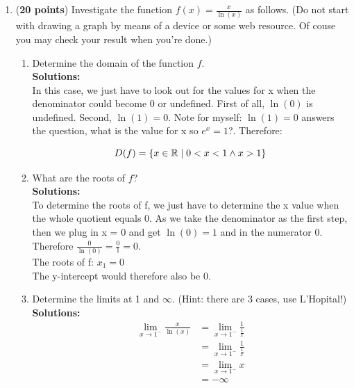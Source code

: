 \documentclass[a4paper]{article}
\begin{document}
\begin{enumerate}


\item (\textbf{20 points}) Investigate the function $f(x) = \frac{x}{\ln(x)}$ as follows. (Do not start with drawing a graph by means of a device or some web resource. Of couse you may check your result when you're done.)

\begin{enumerate}
	\item Determine the domain of the function $f$.\\
	\textbf{Solutions:}\\
	
In this case, we just have to look out for the values for x when the denominator could become 0 or undefined. First of all, $\ln(0)$ is undefined. Second, $\ln(1) = 0$. Note for myself: $\ln(1) = 0$ answers the question, what is the value for x so $e^x = 1$?. Therefore:	
	
	\begin{equation}
		D(f) = \{ x \in \mathbb{R} \; | \;  0 < x < 1 \wedge x > 1\} \notag
	\end{equation}
	
	
	\item What are the roots of $f$?\\
	\textbf{Solutions:}\\

To determine the roots of f, we just have to determine the x value when the whole quotient equals 0. As we take the denominator as the first step, then we plug in x = 0 and get $\ln(0) = 1$ and in the numerator 0. Therefore $\frac{0}{\ln(0)} = \frac{0}{1} = 0$.\\

The roots of f: $x_1 = 0$\\

The y-intercept would therefore also be 0.\\



	\item Determine the limits at 1 and $\infty$. (Hint: there are 3 cases, use L'Hopital!)\\
	\textbf{Solutions:}\\
	

	\begin{align*}
		\lim_{x \to 1^-} \frac{x}{\ln(x)} &= \lim_{x \to 1^-} \frac{1}{\frac{1}{x}}\\
		&= \lim_{x \to 1^-} \frac{1}{\frac{1}{x}}\\
		&= \lim_{x \to 1^-} x\\
		&= -\infty
	\end{align*}
	

\end{enumerate}
\end{enumerate}
\end{document}
